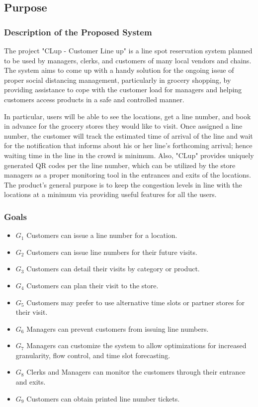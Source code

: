 \subsection{Purpose}

\subsubsection{Description of the Proposed System}
The project "CLup - Customer Line up" is a line spot reservation system planned to be used by managers, clerks, and customers of many local vendors and chains.
The system aims to come up with a handy solution for the ongoing issue of proper social distancing management, particularly in grocery shopping, by providing assistance to cope with the customer load for managers and helping customers access products in a safe and controlled manner.

In particular, users will be able to see the locations, get a line number, and book in advance for the grocery stores they would like to visit.
Once assigned a line number, the customer will track the estimated time of arrival of the line and wait for the notification that informs about his or her line's forthcoming arrival; hence waiting time in the line in the crowd is minimum.
Also, "CLup" provides uniquely generated QR codes per the line number, which can be utilized by the store managers as a proper monitoring tool in the entrances and exits of the locations.
The product's general purpose is to keep the congestion levels in line with the locations at a minimum via providing useful features for all the users.




\subsubsection{Goals}

\begin{itemize}
    \item \textbf{$G_{1}$} Customers can issue a line number for a location.
    \item \textbf{$G_{2}$} Customers can issue line numbers for their future visits.
    \item \textbf{$G_{3}$} Customers can detail their visits by category or product.
    \item \textbf{$G_{4}$} Customers can plan their visit to the store.
    \item \textbf{$G_{5}$} Customers may prefer to use alternative time slots or partner stores for their visit.
    \item \textbf{$G_{6}$} Managers can prevent customers from issuing line numbers.
    \item \textbf{$G_{7}$} Managers can customize the system to allow optimizations for increased granularity, flow control, and time slot forecasting.
    \item \textbf{$G_{8}$} Clerks and Managers can monitor the customers through their entrance and exits.
    \item \textbf{$G_{9}$} Customers can obtain printed line number tickets.
\end{itemize}

